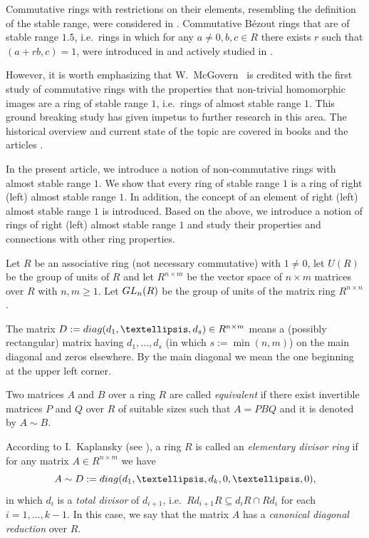 \documentclass[10pt,a4paper]{amsart}
\def\GL{\rm GL}
\def\diag{{\rm diag}}
\theoremstyle{plain}
\theoremstyle{definition}
\begin{document}
Commutative rings with restrictions on their elements, resembling  the definition of the  stable range,  were considered in \cite{Moore_Steger}. Commutative B\'ezout rings that are of stable range  $1.5$, i.e.~rings in which for any $a\not=0, b,c\in R$ there exists $r$ such that $(a+rb,c )= 1$,  were introduced  in \cite{Shchedryk_2005} and actively studied in \cite{Bovdi_Shchedryk, Shchedryk_2017, 2-schedryk}.


However, it is worth emphasizing that W.~McGovern~\cite{4-mcGovern} is credited with the first study of commutative rings with the properties that non-trivial homomorphic images are a ring of stable range $1$, i.e.~rings of almost stable range $1$. This ground breaking study has given impetus to further research in this area.  The historical overview and current state of the topic are covered in books  \cite{Mon_Shchedryk, 12-zabavsky} and the articles \cite{Bovdi_Zabavsky, Bovdi_Shchedryk,  Gatalevich, Calugareanu,  Moore_Steger, Dopico}.



In the present  article, we introduce a notion of non-commutative rings with almost stable range $1$. We show that every ring of stable range  $1$ is a ring of right (left) almost stable range $1$. In addition, the concept of an element of right (left) almost stable range $1$ is introduced. Based on the above, we introduce  a notion of rings of right (left) almost stable range $1$ and study their properties and connections with other ring properties.



Let $R$ be an associative ring (not necessary commutative) with $1\not=0$, let $U(R)$ be the group of units of $R$  and let $R^{n\times m}$ be the vector space  of ${n\times m}$ matrices over $R$ with $n,m\geq 1$. Let $\GL_n(R)$ be the group of units of the matrix ring $R^{n\times n}$.

The matrix $D:=\diag(d_{1},\ldots,d_{s})\in R^{n\times m}$ means a (possibly rectangular) matrix  having $d_{1},\ldots, d_{s}$ (in which $s:=\min(n,m)$) on the main diagonal and zeros elsewhere.  By the main diagonal we mean the one beginning at the upper left corner.



Two matrices $A$ and $B$ over a ring $R$ are called {\it equivalent}  if there exist invertible matrices $P$ and $Q$ over $R$ of  suitable sizes such  that $A=PBQ$ and it  is denoted by $A\sim B$.

According to I.~Kaplansky (see \cite[p.\,465]{7-kaplansky}),    a ring $R$ is called an {\it elementary divisor ring} if for any matrix $A\in R^{n\times m}$ we have
\begin{equation}\label{Eq:1}
A\sim D:=\diag(d_1,\ldots,d_k,0,\ldots,0),
\end{equation}
in which  $d_{i}$ is a {\it total divisor} of $d_{i+1}$, i.e.~$Rd_{i+1}R\subseteq d_iR\cap Rd_i$ for each $i=1,\ldots, k-1$.
In this case, we say that  the matrix $A$ has a  {\it canonical diagonal reduction} over $R$.
\end{document}
